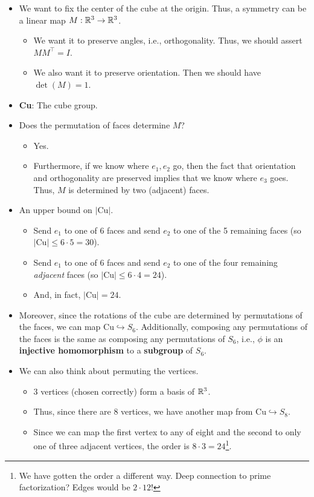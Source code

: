 \documentclass[../notes.tex]{subfiles}
\begin{document}
\begin{itemize}
    \item We want to fix the center of the cube at the origin. Thus, a symmetry can be a linear map $M:\mathbb{R}^3\to\mathbb{R}^3$.
    \begin{itemize}
        \item We want it to preserve angles, i.e., orthogonality. Thus, we should assert $MM^\intercal=I$.
        \item We also want it to preserve orientation. Then we should have $\det(M)=1$.
    \end{itemize}
    \item \textbf{Cu}: The cube group.
    \item Does the permutation of faces determine $M$?
    \begin{itemize}
        \item Yes.
        \item Furthermore, if we know where $e_1,e_2$ go, then the fact that orientation and orthogonality are preserved implies that we know where $e_3$ goes. Thus, $M$ is determined by two (adjacent) faces.
    \end{itemize}
    \item An upper bound on $|\text{Cu}|$.
    \begin{itemize}
        \item Send $e_1$ to one of 6 faces and send $e_2$ to one of the 5 remaining faces (so $|\text{Cu}|\leq 6\cdot 5=30$).
        \item Send $e_1$ to one of 6 faces and send $e_2$ to one of the four remaining \emph{adjacent} faces (so $|\text{Cu}|\leq 6\cdot 4=24$).
        \item And, in fact, $|\text{Cu}|=24$.
    \end{itemize}
    \item Moreover, since the rotations of the cube are determined by permutations of the faces, we can map $\text{Cu}\hookrightarrow S_6$. Additionally, composing any permutations of the faces is the same as composing any permutations of $S_6$, i.e., $\phi$ is an \textbf{injective homomorphism} to a \textbf{subgroup} of $S_6$.
    \item We can also think about permuting the vertices.
    \begin{itemize}
        \item 3 vertices (chosen correctly) form a basis of $\mathbb{R}^3$.
        \item Thus, since there are 8 vertices, we have another map from $\text{Cu}\hookrightarrow S_8$.
        \item Since we can map the first vertex to any of eight and the second to only one of three adjacent vertices, the order is $8\cdot 3=24$\footnote{We have gotten the order a different way. Deep connection to prime factorization? Edges would be $2\cdot 12$!}.

\end{itemize}
\end{itemize}
\end{document}
